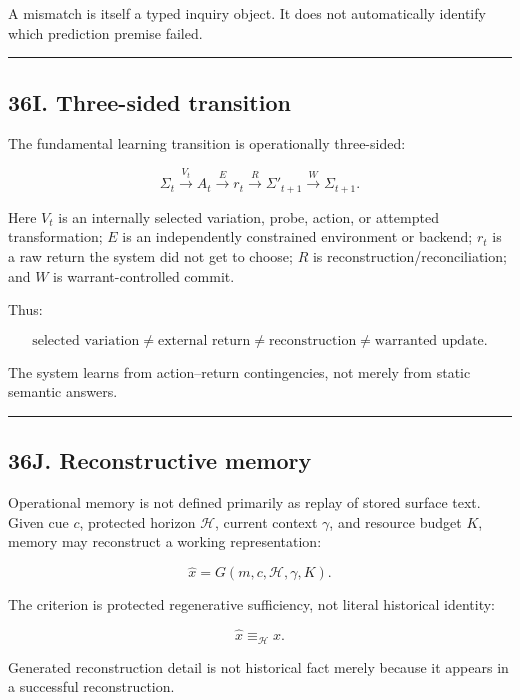 \documentclass[
]{article}
\begin{document}
A mismatch is itself a typed inquiry object. It does not automatically identify
which prediction premise failed.

\begin{center}\rule{0.5\linewidth}{0.5pt}\end{center}

\subsection{36I. Three-sided transition}\label{three-sided-transition}

The fundamental learning transition is operationally three-sided:

\[
\boxed{
\Sigma_t
\xrightarrow{V_t}
A_t
\xrightarrow{E}
r_t
\xrightarrow{R}
\Sigma'_{t+1}
\xrightarrow{W}
\Sigma_{t+1}.
}
\]

Here \(V_t\) is an internally selected variation, probe, action, or attempted
transformation; \(E\) is an independently constrained environment or backend;
\(r_t\) is a raw return the system did not get to choose; \(R\) is
reconstruction/reconciliation; and \(W\) is warrant-controlled commit.

Thus:

\[
\boxed{
\text{selected variation}
\neq
\text{external return}
\neq
\text{reconstruction}
\neq
\text{warranted update}.
}
\]

The system learns from action--return contingencies, not merely from static
semantic answers.

\begin{center}\rule{0.5\linewidth}{0.5pt}\end{center}

\subsection{36J. Reconstructive memory}\label{reconstructive-memory}

Operational memory is not defined primarily as replay of stored surface text.
Given cue \(c\), protected horizon \(\mathcal H\), current context \(\gamma\),
and resource budget \(K\), memory may reconstruct a working representation:

\[
\boxed{
\widehat x=G(m,c,\mathcal H,\gamma,K).
}
\]

The criterion is protected regenerative sufficiency, not literal historical
identity:

\[
\boxed{
\widehat x\equiv_{\mathcal H}x.
}
\]

Generated reconstruction detail is not historical fact merely because it
appears in a successful reconstruction.
\end{document}
